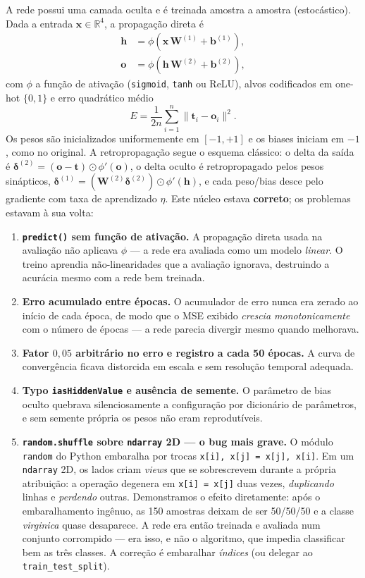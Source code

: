 \documentclass[conference]{IEEEtran}
\begin{document}
A rede possui uma camada oculta e é treinada amostra a amostra (estocástico). Dada a entrada $\mathbf{x} \in \mathbb{R}^4$, a propagação direta é
\begin{align}
\mathbf{h} &= \phi\!\left(\mathbf{x}\,\mathbf{W}^{(1)} + \mathbf{b}^{(1)}\right), \\
\mathbf{o} &= \phi\!\left(\mathbf{h}\,\mathbf{W}^{(2)} + \mathbf{b}^{(2)}\right),
\end{align}
com $\phi$ a função de ativação (\texttt{sigmoid}, \texttt{tanh} ou ReLU), alvos codificados em one-hot $\{0,1\}$ e erro quadrático médio
\begin{equation}
E = \frac{1}{2n}\sum_{i=1}^{n}\lVert \mathbf{t}_i - \mathbf{o}_i \rVert^2 .
\end{equation}
Os pesos são inicializados uniformemente em $[-1, +1]$ e os biases iniciam em $-1$, como no original. A retropropagação segue o esquema clássico: o delta da saída é $\boldsymbol{\delta}^{(2)} = (\mathbf{o} - \mathbf{t}) \odot \phi'(\mathbf{o})$, o delta oculto é retropropagado pelos pesos sinápticos, $\boldsymbol{\delta}^{(1)} = (\mathbf{W}^{(2)}\boldsymbol{\delta}^{(2)}) \odot \phi'(\mathbf{h})$, e cada peso/bias desce pelo gradiente com taxa de aprendizado $\eta$. Este núcleo estava \textbf{correto}; os problemas estavam à sua volta:

\begin{enumerate}
\item \textbf{\texttt{predict()} sem função de ativação.} A propagação direta usada na avaliação não aplicava $\phi$ --- a rede era avaliada como um modelo \emph{linear}. O treino aprendia não-linearidades que a avaliação ignorava, destruindo a acurácia mesmo com a rede bem treinada.
\item \textbf{Erro acumulado entre épocas.} O acumulador de erro nunca era zerado ao início de cada época, de modo que o MSE exibido \emph{crescia monotonicamente} com o número de épocas --- a rede parecia divergir mesmo quando melhorava.
\item \textbf{Fator $0{,}05$ arbitrário no erro e registro a cada 50 épocas.} A curva de convergência ficava distorcida em escala e sem resolução temporal adequada.
\item \textbf{Typo \texttt{iasHiddenValue} e ausência de semente.} O parâmetro de bias oculto quebrava silenciosamente a configuração por dicionário de parâmetros, e sem semente própria os pesos não eram reprodutíveis.
\item \textbf{\texttt{random.shuffle} sobre \texttt{ndarray} 2D --- o bug mais grave.} O módulo \texttt{random} do Python embaralha por trocas \texttt{x[i], x[j] = x[j], x[i]}. Em um \texttt{ndarray} 2D, os lados criam \emph{views} que se sobrescrevem durante a própria atribuição: a operação degenera em \texttt{x[i] = x[j]} duas vezes, \emph{duplicando} linhas e \emph{perdendo} outras. Demonstramos o efeito diretamente: após o embaralhamento ingênuo, as 150 amostras deixam de ser 50/50/50 e a classe \textit{virginica} quase desaparece. A rede era então treinada e avaliada num conjunto corrompido --- era isso, e não o algoritmo, que impedia classificar bem as três classes. A correção é embaralhar \emph{índices} (ou delegar ao \texttt{train\_test\_split}).
\end{enumerate}
\end{document}
